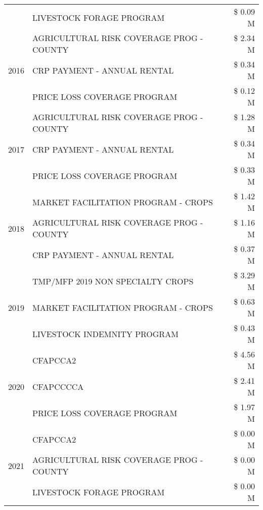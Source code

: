 \begin{tabular}{llr}
 & LIVESTOCK FORAGE PROGRAM & \$ 0.09 M \\
\cline{1-3}
\multirow[t]{3}{*}{2016} & AGRICULTURAL RISK COVERAGE PROG - COUNTY & \$ 2.34 M \\
 & CRP PAYMENT - ANNUAL RENTAL & \$ 0.34 M \\
 & PRICE LOSS COVERAGE PROGRAM & \$ 0.12 M \\
\cline{1-3}
\multirow[t]{3}{*}{2017} & AGRICULTURAL RISK COVERAGE PROG - COUNTY & \$ 1.28 M \\
 & CRP PAYMENT - ANNUAL RENTAL & \$ 0.34 M \\
 & PRICE LOSS COVERAGE PROGRAM & \$ 0.33 M \\
\cline{1-3}
\multirow[t]{3}{*}{2018} & MARKET FACILITATION PROGRAM - CROPS & \$ 1.42 M \\
 & AGRICULTURAL RISK COVERAGE PROG - COUNTY & \$ 1.16 M \\
 & CRP PAYMENT - ANNUAL RENTAL & \$ 0.37 M \\
\cline{1-3}
\multirow[t]{3}{*}{2019} & TMP/MFP 2019 NON SPECIALTY CROPS & \$ 3.29 M \\
 & MARKET FACILITATION PROGRAM - CROPS & \$ 0.63 M \\
 & LIVESTOCK INDEMNITY PROGRAM & \$ 0.43 M \\
\cline{1-3}
\multirow[t]{3}{*}{2020} & CFAPCCA2 & \$ 4.56 M \\
 & CFAPCCCCA & \$ 2.41 M \\
 & PRICE LOSS COVERAGE PROGRAM & \$ 1.97 M \\
\cline{1-3}
\multirow[t]{3}{*}{2021} & CFAPCCA2 & \$ 0.00 M \\
 & AGRICULTURAL RISK COVERAGE PROG - COUNTY & \$ 0.00 M \\
 & LIVESTOCK FORAGE PROGRAM & \$ 0.00 M \\
\cline{1-3}
\bottomrule
\end{tabular}
